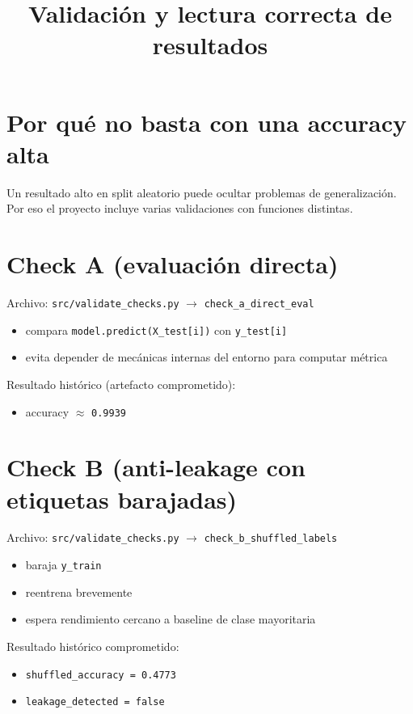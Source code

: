 ﻿\documentclass[12pt,a4paper]{article}
\title{Validación y lectura correcta de resultados}
\date{}
\begin{document}
\maketitle

\section{Por qué no basta con una accuracy alta}

Un resultado alto en split aleatorio puede ocultar problemas de generalización. Por eso el proyecto
incluye varias validaciones con funciones distintas.

\section{Check A (evaluación directa)}

Archivo: \verb|src/validate_checks.py| $\to$ \verb|check_a_direct_eval|

\begin{itemize}
  \item compara \verb|model.predict(X_test[i])| con \verb|y_test[i]|
  \item evita depender de mecánicas internas del entorno para computar métrica
\end{itemize}

Resultado histórico (artefacto comprometido):

\begin{itemize}
  \item accuracy $\approx$ \texttt{0.9939}
\end{itemize}

\section{Check B (anti-leakage con etiquetas barajadas)}

Archivo: \verb|src/validate_checks.py| $\to$ \verb|check_b_shuffled_labels|

\begin{itemize}
  \item baraja \texttt{y\_train}
  \item reentrena brevemente
  \item espera rendimiento cercano a baseline de clase mayoritaria
\end{itemize}

Resultado histórico comprometido:

\begin{itemize}
  \item \texttt{shuffled\_accuracy = 0.4773}
  \item \texttt{leakage\_detected = false}
\end{itemize}
\end{document}
